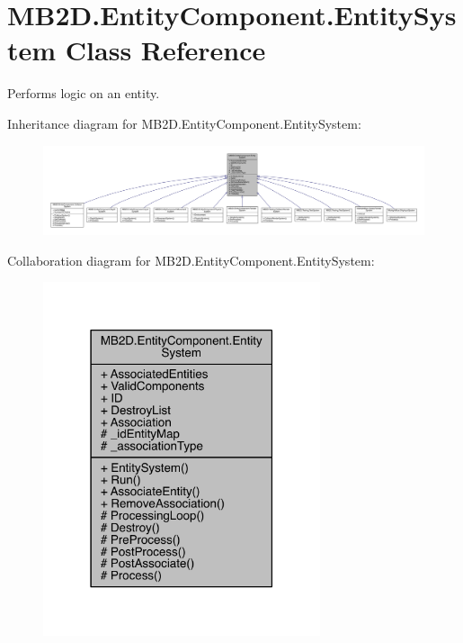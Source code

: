 \hypertarget{class_m_b2_d_1_1_entity_component_1_1_entity_system}{}\section{M\+B2\+D.\+Entity\+Component.\+Entity\+System Class Reference}
\label{class_m_b2_d_1_1_entity_component_1_1_entity_system}


Performs logic on an entity.  




Inheritance diagram for M\+B2\+D.\+Entity\+Component.\+Entity\+System\+:\nopagebreak
\begin{figure}[H]
\begin{center}
\leavevmode
\includegraphics[width=350pt]{class_m_b2_d_1_1_entity_component_1_1_entity_system__inherit__graph}
\end{center}
\end{figure}


Collaboration diagram for M\+B2\+D.\+Entity\+Component.\+Entity\+System\+:\nopagebreak
\begin{figure}[H]
\begin{center}
\leavevmode
\includegraphics[width=231pt]{class_m_b2_d_1_1_entity_component_1_1_entity_system__coll__graph}
\end{center}
\end{figure}
